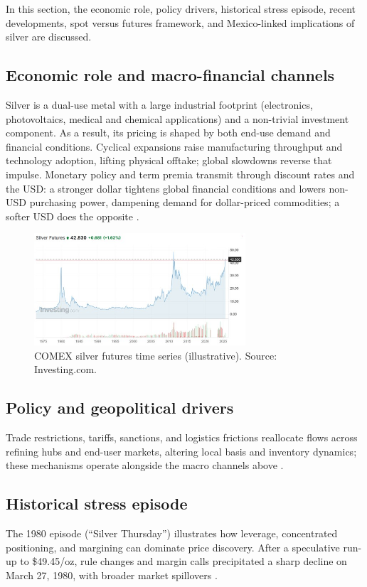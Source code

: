 \documentclass[10pt,a4paper]{article} %
\begin{document}
In this section, the economic role, policy drivers, historical stress episode, recent developments, spot versus futures framework, and Mexico-linked implications of silver are discussed.

\subsection{Economic role and macro-financial channels}
Silver is a dual-use metal with a large industrial footprint (electronics, photovoltaics, medical and chemical applications) and a non-trivial investment component. As a result, its pricing is shaped by both end-use demand and financial conditions. Cyclical expansions raise manufacturing throughput and technology adoption, lifting physical offtake; global slowdowns reverse that impulse. Monetary policy and term premia transmit through discount rates and the USD: a stronger dollar tightens global financial conditions and lowers non-USD purchasing power, dampening demand for dollar-priced commodities; a softer USD does the opposite \citep{silver_institute_wss_2024,usgs_silver_mcs_2024,bis_usd_commodity_2023}.

\begin{figure}[h]
\centering
\includegraphics[width=0.7\textwidth]{figures/silver_time_series.jpg}
\caption{COMEX silver futures time series (illustrative). Source: Investing.com.}
\label{fig:silver_time_series}
\end{figure}

\subsection{Policy and geopolitical drivers}
Trade restrictions, tariffs, sanctions, and logistics frictions reallocate flows across refining hubs and end-user markets, altering local basis and inventory dynamics; these mechanisms operate alongside the macro channels above \citep{silver_institute_wss_2024}.

\subsection{Historical stress episode}
The 1980 episode (“Silver Thursday”) illustrates how leverage, concentrated positioning, and margining can dominate price discovery. After a speculative run-up to \$49.45/oz, rule changes and margin calls precipitated a sharp decline on March 27, 1980, with broader market spillovers \citep{britannica_silver_thursday,nyt_1980_silver_thursday}.
\end{document}
